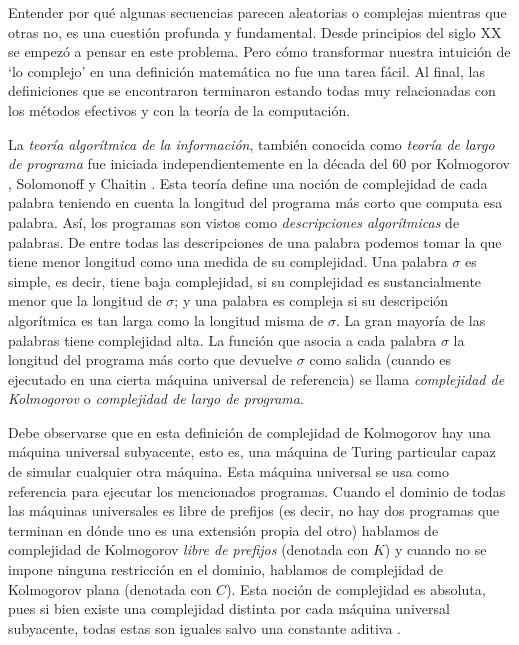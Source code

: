 Entender por qué
algunas secuencias parecen aleatorias o complejas mientras que otras no, es una cuestión
profunda y fundamental. Desde principios del siglo {\small XX} se
empezó a pensar en este problema. Pero cómo transformar nuestra
intuición de `lo complejo' en una definición matemática no fue una tarea fácil. 
Al final, las definiciones que se
encontraron terminaron estando todas muy relacionadas con los métodos efectivos y con la 
teoría de la computación.


La {\em teoría algorítmica de la información}, también
conocida como {\em teoría de largo de programa} fue iniciada
independientemente en la década del 60 por Kolmogorov \cite{kolmogorov1965three},
Solomonoff \cite{solomonoff1964formal} y Chaitin \cite{chaitin1969length}. 
Esta teoría define una
noción de complejidad de cada palabra teniendo en cuenta la longitud
del programa más corto que computa esa palabra. Así, los programas
son vistos como {\em descripciones algorítmicas} de palabras. De
entre todas las descripciones de una palabra podemos tomar la que
tiene menor longitud como una medida de su complejidad. Una palabra
$\sigma$ es simple, es decir, tiene baja complejidad, si su
complejidad es sustancialmente menor que la longitud de $\sigma$; y
una palabra es compleja si su descripción algorítmica es tan larga
como la longitud misma de $\sigma$. La gran mayoría
de las palabras tiene complejidad alta. La función que asocia a cada
palabra $\sigma$ la longitud del programa más corto que devuelve
$\sigma$ como salida (cuando es ejecutado en una cierta máquina
universal de referencia) se llama {\em complejidad de Kolmogorov} o
{\em complejidad de largo de programa}.

Debe
observarse que en esta definición de complejidad de Kolmogorov hay
una máquina universal subyacente, esto es, una máquina de Turing
particular capaz de simular cualquier otra máquina.
Esta
máquina universal se usa como referencia para ejecutar los
mencionados programas. Cuando el dominio de todas las máquinas
universales es libre de prefijos (es decir, no hay dos programas
que terminan en dónde uno es una extensión propia del otro)
hablamos de complejidad de Kolmogorov {\em libre de prefijos}
(denotada con $K$) y cuando no se impone ninguna restricción en
el dominio, hablamos de complejidad de Kolmogorov plana (denotada
con $C$).
Esta noción de complejidad es absoluta, pues si bien existe una
complejidad distinta por cada máquina universal subyacente, todas
estas son iguales salvo una constante aditiva \cite{C94,LV97}.

